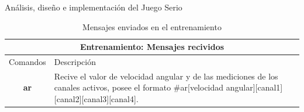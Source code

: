 \begin{thesischapter}{2} {Análisis, diseño e implementación del Juego Serio}
\vspace{80pt}
\begin{table}[h]
    \centering
    \begin{tabular}{ |c|p{14cm}|}
        \hline
        \multicolumn{2}{|c|}{Entrenamiento: Mensajes recividos} \\
        \hline
        Comandos        &   Descripción \\\hline
        \textbf{ar}     &   \begin{minipage}{14cm}
                                \vspace{2pt}    
                                Recive el valor de velocidad angular y de las mediciones de los canales activos, posee el formato 
                                \#ar[velocidad angular][canal1][canal2][canal3][canal4]. 
                                \vspace{2pt}    
                            \end{minipage}\\\hline 
    \end{tabular}
    \caption{Mensajes enviados en el entrenamiento}
    \label{table:recived-msg-in-game}
\end{table}


\end{thesischapter}
